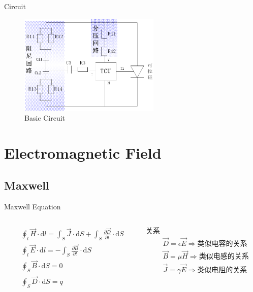 \documentclass{beamer}
\begin{document}
\begin{frame}{Circuit}
  \begin{figure}
    \centering
    \includegraphics[width=0.6\textwidth]{figures/circuit}
    \caption{Basic Circuit}
  \end{figure}
\end{frame}

\section{Electromagnetic Field}
\subsection{Maxwell}
\begin{frame}{Maxwell Equation}
  \begin{columns}
    \begin{column}{0.55\textwidth}
      \begin{align*}
        &\oint_l\vec{H}\cdot\mathrm{d}l=\int_S\vec{J}\cdot\mathrm{d}S+\int_S \frac{\partial\vec{D}}{\partial t}\cdot\mathrm{d}S \\
        &\oint_l\vec{E}\cdot\mathrm{d}l=-\int_S\frac{\partial\vec{B}}{\partial t}\cdot\mathrm{d}S \\
        &\oint_S\vec{B}\cdot\mathrm{d}S=0 \\
        &\oint_S\vec{D}\cdot\mathrm{d}S=q \\
      \end{align*}
    \end{column}
    \begin{column}{0.45\textwidth}
      \begin{block}{关系}
        \begin{align*}
          &\vec{D}=\epsilon\vec{E} \Rightarrow \mbox{类似电容的关系} \\
          &\vec{B}=\mu\vec{H} \Rightarrow \mbox{类似电感的关系} \\
          &\vec{J}=\gamma\vec{E} \Rightarrow \mbox{类似电阻的关系} \\
        \end{align*}
      \end{block}
    \end{column}
  \end{columns}
\end{frame}
\end{document}
